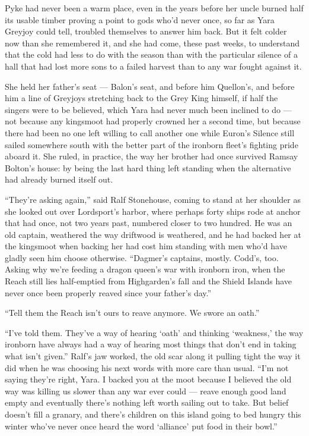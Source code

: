 Pyke had never been a warm place, even in the years before her uncle burned half its usable timber proving a point to gods who’d never once, so far as Yara Greyjoy could tell, troubled themselves to answer him back. But it felt colder now than she remembered it, and she had come, these past weeks, to understand that the cold had less to do with the season than with the particular silence of a hall that had lost more sons to a failed harvest than to any war fought against it.

She held her father’s seat — Balon’s seat, and before him Quellon’s, and before him a line of Greyjoys stretching back to the Grey King himself, if half the singers were to be believed, which Yara had never much been inclined to do — not because any kingsmoot had properly crowned her a second time, but because there had been no one left willing to call another one while Euron’s Silence still sailed somewhere south with the better part of the ironborn fleet’s fighting pride aboard it. She ruled, in practice, the way her brother had once survived Ramsay Bolton’s house: by being the last hard thing left standing when the alternative had already burned itself out.

“They’re asking again,” said Ralf Stonehouse, coming to stand at her shoulder as she looked out over Lordsport’s harbor, where perhaps forty ships rode at anchor that had once, not two years past, numbered closer to two hundred. He was an old captain, weathered the way driftwood is weathered, and he had backed her at the kingsmoot when backing her had cost him standing with men who’d have gladly seen him choose otherwise. “Dagmer’s captains, mostly. Codd’s, too. Asking why we’re feeding a dragon queen’s war with ironborn iron, when the Reach still lies half-emptied from Highgarden’s fall and the Shield Islands have never once been properly reaved since your father’s day.”

“Tell them the Reach isn’t ours to reave anymore. We swore an oath.”

“I’ve told them. They’ve a way of hearing ‘oath’ and thinking ‘weakness,’ the way ironborn have always had a way of hearing most things that don’t end in taking what isn’t given.” Ralf’s jaw worked, the old scar along it pulling tight the way it did when he was choosing his next words with more care than usual. “I’m not saying they’re right, Yara. I backed you at the moot because I believed the old way was killing us slower than any war ever could — reave enough good land empty and eventually there’s nothing left worth sailing out to take. But belief doesn’t fill a granary, and there’s children on this island going to bed hungry this winter who’ve never once heard the word ‘alliance’ put food in their bowl.”

